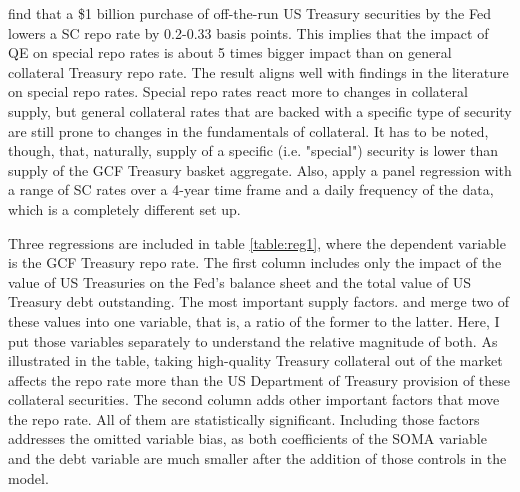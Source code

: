 \documentclass[11pt,a4paper,english,oneside]{article}
\begin{document}
\citet{damico2014} find that a \$1 billion purchase of off-the-run US Treasury securities by the Fed lowers a SC repo rate by 0.2-0.33 basis points. This implies that the impact of QE on special repo rates is about 5 times bigger impact than on general collateral Treasury repo rate. The result aligns well with findings in the literature on special repo rates. Special repo rates react more to changes in collateral supply, but general collateral rates that are backed with a specific type of security are still prone to changes in the fundamentals of collateral. It has to be noted, though, that, naturally, supply of a specific (i.e. "special") security is lower than supply of the GCF Treasury basket aggregate. Also, \citet{damico2014} apply a panel regression with a range of SC rates over a 4-year time frame and a daily frequency of the data, which is a completely different set up.

Three regressions are included in table \ref{table:reg1}, where the dependent variable is the GCF Treasury repo rate. The first column includes only the impact of the value of US Treasuries on the Fed's balance sheet and the total value of US Treasury debt outstanding. The most important supply factors. \citet{damico2014} and \citet{arrata2018} merge two of these values into one variable, that is, a ratio of the former to the latter. Here, I put those variables separately to understand the relative magnitude of both. As illustrated in the table, taking high-quality Treasury collateral out of the market affects the repo rate more than the US Department of Treasury provision of these collateral securities. The second column adds other important factors that move the repo rate. All of them are statistically significant. Including those factors addresses the omitted variable bias, as both coefficients of the SOMA variable and the debt variable are much smaller after the addition of those controls in the model.

\end{document}
